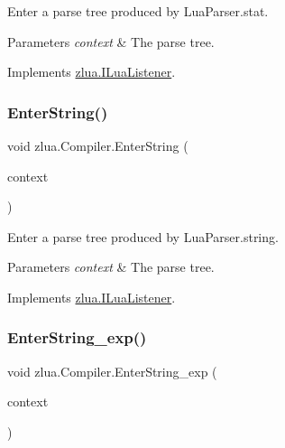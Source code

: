 Enter a parse tree produced by Lua\+Parser.\+stat. 


\begin{DoxyParams}{Parameters}
{\em context} & The parse tree.\\
\hline
\end{DoxyParams}


Implements \mbox{\hyperlink{interfacezlua_1_1_i_lua_listener_a4d0313123030b6de6c2e4b63a00bb66f}{zlua.\+I\+Lua\+Listener}}.

\mbox{\label{classzlua_1_1_compiler_a994696673f9c1c41e00d65b1e7bb1d39}} 
\subsubsection{\texorpdfstring{Enter\+String()}{EnterString()}}
{\footnotesize\ttfamily void zlua.\+Compiler.\+Enter\+String (\begin{DoxyParamCaption}\item[{\mbox{[}\+Not\+Null\mbox{]} \mbox{\hyperlink{classzlua_1_1_lua_parser_1_1_string_context}{Lua\+Parser.\+String\+Context}}}]{context }\end{DoxyParamCaption})}



Enter a parse tree produced by Lua\+Parser.\+string. 


\begin{DoxyParams}{Parameters}
{\em context} & The parse tree.\\
\hline
\end{DoxyParams}


Implements \mbox{\hyperlink{interfacezlua_1_1_i_lua_listener_a47729a5ed96c8b8310250fae283584ec}{zlua.\+I\+Lua\+Listener}}.

\mbox{\label{classzlua_1_1_compiler_aed4778e096225183ba6add21e832faaf}} 
\subsubsection{\texorpdfstring{Enter\+String\+\_\+exp()}{EnterString\_exp()}}
{\footnotesize\ttfamily void zlua.\+Compiler.\+Enter\+String\+\_\+exp (\begin{DoxyParamCaption}\item[{\mbox{[}\+Not\+Null\mbox{]} \mbox{\hyperlink{classzlua_1_1_lua_parser_1_1_string__exp_context}{Lua\+Parser.\+String\+\_\+exp\+Context}}}]{context }\end{DoxyParamCaption})}



